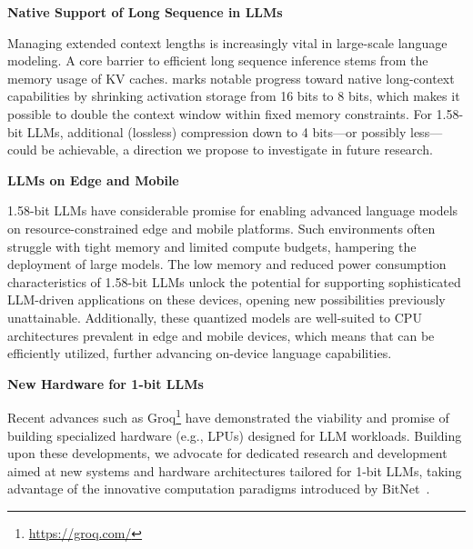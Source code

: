 \textbf{Native Support of Long Sequence in LLMs}

Managing extended context lengths is increasingly vital in large-scale language modeling. A core barrier to efficient long sequence inference stems from the memory usage of KV caches.  marks notable progress toward native long-context capabilities by shrinking activation storage from 16 bits to 8 bits, which makes it possible to double the context window within fixed memory constraints. For 1.58-bit LLMs, additional (lossless) compression down to 4 bits—or possibly less—could be achievable, a direction we propose to investigate in future research.

\textbf{LLMs on Edge and Mobile}

1.58-bit LLMs have considerable promise for enabling advanced language models on resource-constrained edge and mobile platforms. Such environments often struggle with tight memory and limited compute budgets, hampering the deployment of large models. The low memory and reduced power consumption characteristics of 1.58-bit LLMs unlock the potential for supporting sophisticated LLM-driven applications on these devices, opening new possibilities previously unattainable. Additionally, these quantized models are well-suited to CPU architectures prevalent in edge and mobile devices, which means that  can be efficiently utilized, further advancing on-device language capabilities.

\textbf{New Hardware for 1-bit LLMs}

Recent advances such as Groq\footnote{\url{https://groq.com/}} have demonstrated the viability and promise of building specialized hardware (e.g., LPUs) designed for LLM workloads. Building upon these developments, we advocate for dedicated research and development aimed at new systems and hardware architectures tailored for 1-bit LLMs, taking advantage of the innovative computation paradigms introduced by BitNet~\cite{bitnet}.


